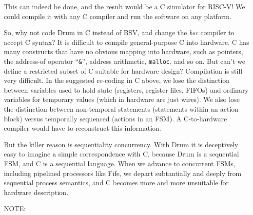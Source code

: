 This can indeed be done, and the result would be a C simulator for
RISC-V!  We could compile it with any C compiler and run the software
on any platform.

So, why not code Drum in C instead of BSV, and change the \emph{bsc}
compiler to accept C syntax?  It is difficult to compile
general-purpose C into hardware.  C has many constructs that have no
obvious mapping into hardware, such as pointers, the address-of
operator ``\verb|&|'', address arithmetic, \verb|malloc|, and so on.
But can't we define a restricted subset of C suitable for hardware
design?  Compilation is still very difficult.  In the suggested
re-coding in C above, we lose the distinction between variables used
to hold state (registers, register files, FIFOs) and ordinary
variables for temporary values (which in hardware are just wires).  We
also lose the distinction between non-temporal statements (statements
within an action block) versus temporally sequenced (actions in an
FSM).  A C-to-hardware compiler would have to reconstruct this
information.

But the killer reason is sequentiality {\vs} concurrency.  With Drum
it is deceptively easy to imagine a simple correspondence with C,
because Drum is a sequential FSM, and C is a sequential language.
When we advance to concurrent FSMs, including pipelined processors
like Fife, we depart subtantially and deeply from sequential process
semantics, and C becomes more and more unsuitable for hardware
description.

\vspace{2ex}

NOTE: 

